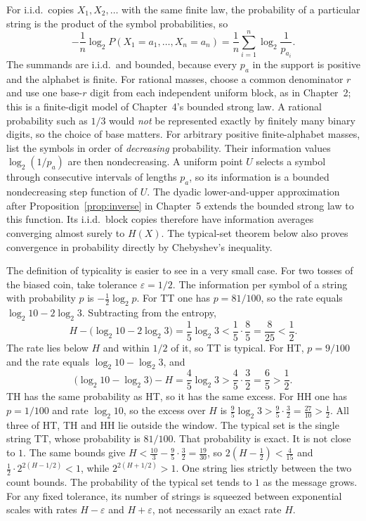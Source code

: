 For i.i.d.\ copies $X_1,X_2,\ldots$ with the same finite law, the probability of a particular string is the product of the symbol probabilities, so
\[
 -\frac1n\log_2 P(X_1=a_1,\ldots,X_n=a_n)=\frac1n\sum_{i=1}^n\log_2\frac1{p_{a_i}}.
\]
The summands are i.i.d.\ and bounded, because every $p_a$ in the support is positive and the alphabet is finite. For rational masses, choose a common denominator $r$ and use one base-$r$ digit from each independent uniform block, as in Chapter~2; this is a finite-digit model of Chapter~4's bounded strong law. A rational probability such as $1/3$ would \emph{not} be represented exactly by finitely many binary digits, so the choice of base matters. For arbitrary positive finite-alphabet masses, list the symbols in order of \emph{decreasing} probability. Their information values $\log_2(1/p_a)$ are then nondecreasing. A uniform point $U$ selects a symbol through consecutive intervals of lengths $p_a$, so its information is a bounded nondecreasing step function of $U$. The dyadic lower-and-upper approximation after Proposition~\ref{prop:inverse} in Chapter~5 extends the bounded strong law to this function. Its i.i.d.\ block copies therefore have information averages converging almost surely to $H(X)$. The typical-set theorem below also proves convergence in probability directly by Chebyshev's inequality.

The definition of typicality is easier to see in a very small case. For two tosses of the biased coin, take tolerance $\varepsilon=1/2$. The information per symbol of a string with probability $p$ is $-\frac12\log_2 p$. For TT one has $p=81/100$, so the rate equals $\log_2 10-2\log_2 3$. Subtracting from the entropy,
\[
 H-\bigl(\log_2 10-2\log_2 3\bigr)=\frac15\log_2 3<\frac15\cdot\frac85=\frac8{25}<\frac12.
\]
The rate lies below $H$ and within $1/2$ of it, so TT is typical. For HT, $p=9/100$ and the rate equals $\log_2 10-\log_2 3$, and
\[
 \bigl(\log_2 10-\log_2 3\bigr)-H=\frac45\log_2 3>\frac45\cdot\frac32=\frac65>\frac12.
\]
TH has the same probability as HT, so it has the same excess. For HH one has $p=1/100$ and rate $\log_2 10$, so the excess over $H$ is $\tfrac95\log_2 3>\tfrac95\cdot\tfrac32=\tfrac{27}{10}>\tfrac12$. All three of HT, TH and HH lie outside the window. The typical set is the single string TT, whose probability is $81/100$. That probability is exact. It is not close to $1$. The same bounds give $H<\tfrac{10}3-\tfrac95\cdot\tfrac32=\tfrac{19}{30}$, so $2(H-\tfrac12)<\tfrac4{15}$ and $\tfrac12\cdot 2^{2(H-1/2)}<1$, while $2^{2(H+1/2)}>1$. One string lies strictly between the two count bounds. The probability of the typical set tends to $1$ as the message grows. For any fixed tolerance, its number of strings is squeezed between exponential scales with rates $H-\varepsilon$ and $H+\varepsilon$, not necessarily an exact rate $H$.


